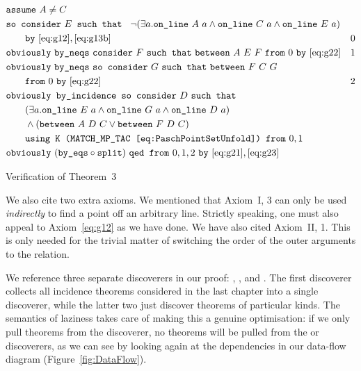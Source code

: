 \begin{boxedfigure}
  \begin{align*}
    &\code{assume}\ A\neq C\\
    &\code{so consider}\ E \code{ such that }\ \Triangle{a}{A}{C}{E}\\
    &\qquad\code{by}\ \eqref{eq:g12},\eqref{eq:g13b}& 0\\
    &\code{obviously}\ \code{by\_neqs}\ \code{consider}\ F\ \code{such that}\ \between{A}{E}{F}\ \code{from}\ 0\ \code{by}\ \eqref{eq:g22} & 1\\
    &\code{obviously}\ \code{by\_neqs}\ \code{so consider}\ G\ \code{such that}\ \between{F}{C}{G}\\&\qquad \code{from}\ 0\ \code{by}\ \eqref{eq:g22} & 2\\
    &\code{obviously by\_incidence so consider}\ D\ \code{such that}\\
    &\qquad(\exists a. \code{on\_line}\ E\ a \wedge \code{on\_line}\ G\ a \wedge \code{on\_line}\ D\ a)\\
    &\qquad \wedge (\between{A}{D}{C}\vee\between{F}{D}{C})\\
    &\qquad \code{using K (MATCH\_MP\_TAC \eqref{eq:PaschPointSetUnfold}) from}\ 0,1\\
    &\code{obviously}\ (\code{by\_eqs}\circ\code{split})\ \code{qed from}\ 0,1,2\ \code{by}\ \eqref{eq:g21},\eqref{eq:g23}
  \end{align*}
\caption{Verification of Theorem~3}
\label{fig:ThreeVerification}
\end{boxedfigure}

We also cite two extra axioms. We mentioned that Axiom~I, 3 can only be used \emph{indirectly} to find a point off an arbitrary line. Strictly speaking, one must also appeal to Axiom~\eqref{eq:g12} as we have done. We have also cited Axiom~II, 1. This is only needed for the trivial matter of switching the order of the outer arguments to the  relation. 

We reference three separate discoverers in our proof: , , and . The first discoverer collects all incidence theorems considered in the last chapter into a single discoverer, while the latter two just discover theorems of particular kinds. The semantics of laziness takes care of making this a genuine optimisation: if we only pull theorems from the  discoverer, no theorems will be pulled from the  or  discoverers, as we can see by looking again at the dependencies in our data-flow diagram (Figure~\ref{fig:DataFlow}).

